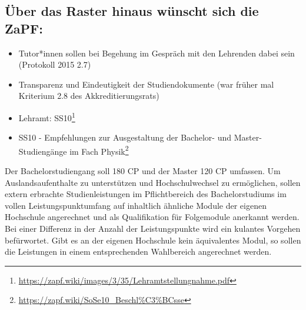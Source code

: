     \subsection*{Über das Raster hinaus wünscht sich die ZaPF:}
      \begin{itemize}
        \item Tutor*innen sollen bei Begehung im Gespräch mit den Lehrenden dabei sein (Protokoll 2015 2.7)
        \item Transparenz und Eindeutigkeit der Studiendokumente (war früher mal Kriterium 2.8 des Akkreditierungsrats)
        \item Lehramt: SS10\footnote{\url{https://zapf.wiki/images/3/35/Lehramtstellungnahme.pdf}}
        \item SS10 - Empfehlungen zur Ausgestaltung der Bachelor- und Master-Studiengänge im Fach Physik\footnote{\url{https://zapf.wiki/SoSe10_Beschl\%C3\%BCsse}}
      \end{itemize}

Der Bachelorstudiengang soll 180 CP und der Master 120 CP umfassen.
Um Auslandsaufenthalte zu unterstützen und Hochschulwechsel zu ermöglichen, sollen extern erbrachte Studienleistungen im Pflichtbereich des Bachelorstudiums im vollen Leistungspunktumfang auf inhaltlich ähnliche Module der eigenen Hochschule angerechnet und als Qualifikation für Folgemodule anerkannt werden. Bei einer Differenz in der Anzahl der Leistungspunkte wird ein kulantes Vorgehen befürwortet. Gibt es an der eigenen Hochschule kein äquivalentes Modul, so sollen die Leistungen in einem entsprechenden Wahlbereich angerechnet werden.


